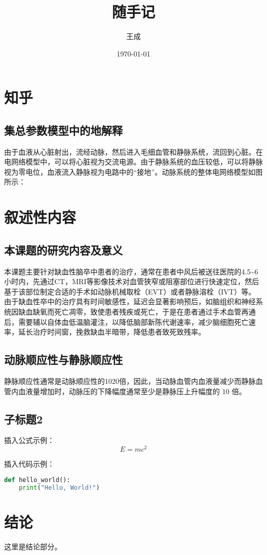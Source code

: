 \documentclass[12pt,a4paper]{article} %
\title{随手记} %
\author{王成} %
\date{\today} %
\begin{document}
\maketitle %

\section{知乎}
\subsection{集总参数模型中的地解释}
\colorbox{yellow!20}{
    \parbox{\dimexpr\linewidth-2\fboxsep}{
        由于血液从心脏射出，流经动脉，然后进入毛细血管和静脉系统，流回到心脏。在电网络模型中，可以将心脏视为交流电源。由于静脉系统的血压较低，可以将静脉视为零电位，血液流入静脉视为电路中的“接地”。动脉系统的整体电网络模型如图所示：
    }
}

\section{叙述性内容}
\subsection{本课题的研究内容及意义}
本课题主要针对缺血性脑卒中患者的治疗，通常在患者中风后被送往医院的4.5\textasciitilde6小时内，先通过CT，MRI等影像技术对血管狭窄或阻塞部位进行快速定位，然后基于该部位制定合适的手术如动脉机械取栓（EVT）或者静脉溶栓（IVT）等。
由于缺血性卒中的治疗具有时间敏感性，延迟会显著影响预后，如脑组织和神经系统因缺血缺氧而死亡凋零，致使患者残疾或死亡，于是在患者通过手术血管再通后，需要辅以自体血低温脑灌注，以降低脑部新陈代谢速率，减少脑细胞死亡速率，延长治疗时间窗，挽救缺血半暗带，降低患者致死致残率。

\subsection{动脉顺应性与静脉顺应性}
    静脉顺应性通常是动脉顺应性的10\textendash 20倍，因此，当动脉血管内血液量减少而静脉血管内血液量增加时，动脉压的下降幅度通常至少是静脉压上升幅度的 10 倍。
\subsection{子标题2}
插入公式示例：
\begin{equation}
    E = mc^2
\end{equation}



插入代码示例：
\begin{lstlisting}[language=Python, caption=Python代码示例]
def hello_world():
    print("Hello, World!")
\end{lstlisting}

\section{结论}
这里是结论部分。
\end{document}
